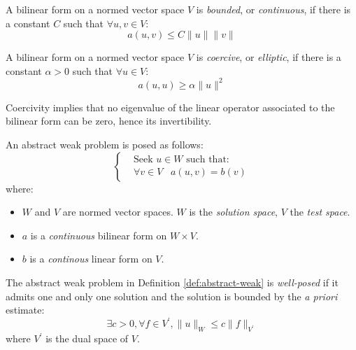 \begin{defin}[Continuity]\label{def:continuity}
  A bilinear form on a normed vector space $V$ is \emph{bounded}, or
  \emph{continuous}, if there is a constant $C$ such that
  $\forall u, v \in V$:
  \[
  a(u, v) \leq C\lVert u\rVert\lVert v\rVert
  \]
\end{defin}

\begin{defin}[Coercivity]\label{def:coercivity}
  A bilinear form on a normed vector space $V$ is \emph{coercive},
  or \emph{elliptic}, if there is a constant $\alpha >0$ such that
  $\forall u \in V$:
  \[
  a(u, u) \geq \alpha\lVert u\rVert^2
  \]
\end{defin}
Coercivity implies that no eigenvalue of the linear operator associated to the
bilinear form can be zero, hence its invertibility.~\autocite{Ern2004-oo}

\begin{defin}\label{def:abstract-weak}
An abstract weak problem is posed as follows:
\begin{equation}
  \left\{
  \begin{aligned}
    &\text{Seek $u \in W$ such that:}\\
    &\forall v \in V \,\,\,\,\,
    a(u, v) = b(v)
  \end{aligned}
  \right.
  \label{eq:weak}
\end{equation}
where:
\begin{itemize}
  \item $W$ and $V$ are normed vector spaces. $W$ is the \emph{solution space},
  $V$ the \emph{test space}.
  \item $a$ is a \emph{continuous} bilinear form on $W \times V$.
  \item $b$ is a \emph{continous} linear form on $V$.
\end{itemize}
\end{defin}

\begin{defin}\label{def:hadamard}
The abstract weak problem in Definition \ref{def:abstract-weak} is
\emph{well-posed} if it admits one and only one solution and the solution is
bounded by the \emph{a priori} estimate:
\begin{equation}
\exists c > 0, \forall f \in V^\prime, \|u\|_W \leq c \|f\|_{V^\prime}
\end{equation}
where $V^\prime$ is the dual space of $V$.
\end{defin}

